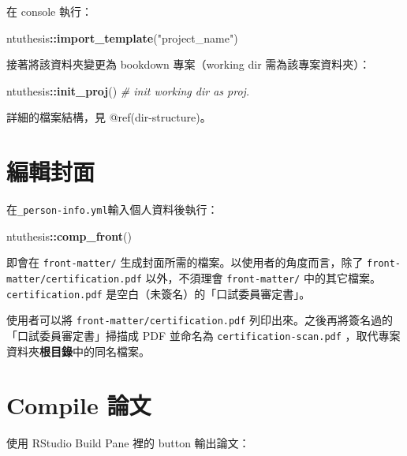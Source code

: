 \documentclass[oneside]{book}
\newenvironment{Shaded}{\begin{snugshade}}{\end{snugshade}}
\newcommand{\CommentTok}[1]{\textcolor[rgb]{0.56,0.35,0.01}{\textit{#1}}}
\newcommand{\KeywordTok}[1]{\textcolor[rgb]{0.13,0.29,0.53}{\textbf{#1}}}
\newcommand{\NormalTok}[1]{#1}
\newcommand{\OperatorTok}[1]{\textcolor[rgb]{0.81,0.36,0.00}{\textbf{#1}}}
\newcommand{\StringTok}[1]{\textcolor[rgb]{0.31,0.60,0.02}{#1}}
\begin{document}
在 console 執行：

\begin{Shaded}
\begin{Highlighting}[]
\NormalTok{ntuthesis}\OperatorTok{::}\KeywordTok{import_template}\NormalTok{(}\StringTok{"project_name"}\NormalTok{)}
\end{Highlighting}
\end{Shaded}

接著將該資料夾變更為 bookdown 專案（working dir 需為該專案資料夾）：

\begin{Shaded}
\begin{Highlighting}[]
\NormalTok{ntuthesis}\OperatorTok{::}\KeywordTok{init_proj}\NormalTok{()  }\CommentTok{# init working dir as proj.}
\end{Highlighting}
\end{Shaded}

詳細的檔案結構，見 @ref(dir-structure)。

\hypertarget{edit-front-matter}{%
\section{編輯封面}\label{edit-front-matter}}

在\texttt{\_person-info.yml}輸入個人資料後執行：

\begin{Shaded}
\begin{Highlighting}[]
\NormalTok{ntuthesis}\OperatorTok{::}\KeywordTok{comp_front}\NormalTok{()}
\end{Highlighting}
\end{Shaded}

即會在 \texttt{front-matter/} 生成封面所需的檔案。以使用者的角度而言，除了 \texttt{front-matter/certification.pdf} 以外，不須理會 \texttt{front-matter/} 中的其它檔案。\texttt{certification.pdf} 是空白（未簽名）的「口試委員審定書」。

使用者可以將 \texttt{front-matter/certification.pdf} 列印出來。之後再將簽名過的「口試委員審定書」掃描成 PDF 並命名為 \texttt{certification-scan.pdf} ，取代專案資料夾\textbf{根目錄}中的同名檔案。

\hypertarget{compile-thesis}{%
\section{Compile 論文}\label{compile-thesis}}

使用 RStudio Build Pane 裡的 button 輸出論文：
\end{document}

